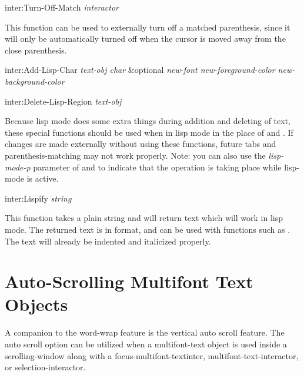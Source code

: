 \begin{programexample}
inter:Turn-Off-Match {\it interactor}\value{function}
\end{programexample}

This function can be used to externally turn off a matched parenthesis, since
it will only be automatically turned off when the cursor is moved away from the
close parenthesis.


\begin{programexample}
inter:Add-Lisp-Char {\it text-obj char} \&optional {\it new-font new-foreground-color new-background-color}\value{function}

inter:Delete-Lisp-Region {\it text-obj}\value{function}
\end{programexample}

Because lisp mode does some extra things during addition and deleting of text,
these special functions should be used when in lisp mode in the place of
 and .  If changes are made
externally without using these functions, future tabs and parenthesis-matching
may not work properly.  Note: you can also use the {\it lisp-mode-p} parameter
of  and  to indicate that the
operation is taking place while lisp-mode is active.

\vspace{1 line}
\begin{programexample}
inter:Lispify {\it string}\value{function}
\end{programexample}

This function takes a plain string and will return text which will work in
lisp mode.  The returned text is in  format, and can be used
with functions such as .  The text will already be indented and
italicized properly.



\section{Auto-Scrolling Multifont Text Objects}

A companion to the word-wrap feature is the vertical auto scroll feature.
The auto scroll option can be utilized when a multifont-text object is
used inside a scrolling-window along with a focus-multifont-textinter,
multifont-text-interactor, or selection-interactor.

